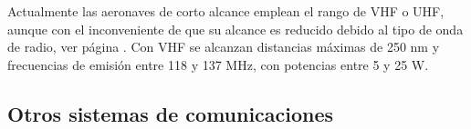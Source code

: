 Actualmente las aeronaves de corto alcance emplean el rango de VHF o UHF, aunque con el inconveniente de que su alcance es reducido debido al tipo de onda de radio, ver p\'agina \pageref{sec:A.07.propagacion.ondas.radio}. Con VHF se alcanzan distancias m\'aximas de 250 nm y frecuencias de emisi\'on entre 118 y 137 MHz, con potencias entre 5 y 25 W.











\subsection{Otros sistemas de comunicaciones}
\label{sec:09.01.05.otros.sistemas.comunicaciones}

